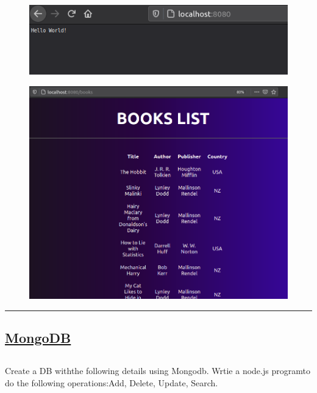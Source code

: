 \documentclass[12pt,letterpaper]{article}
\begin{document}
\subsection*{}
\begin{figure}[h]
    \centering
    \includegraphics[width = \textwidth]{WebServer/op1.png}
\end{figure}
\begin{figure}
    \centering
    \includegraphics[width = \textwidth]{WebServer/op2.png}
\end{figure}
\hrule

\newpage
\subsection*{\underline{\textbf{MongoDB}}}
\subsection*{}
\begin{flushleft}
    Create a DB withthe following details using Mongodb.
    Wrtie a node.js programto do the following operations:Add, Delete, Update, Search.
\end{flushleft}
\end{document}
